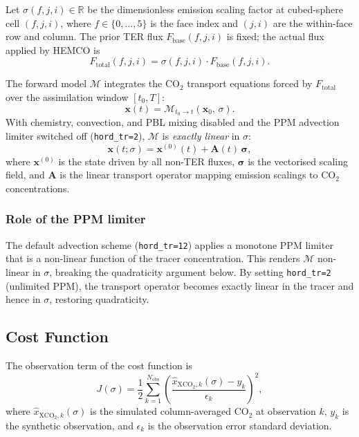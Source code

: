 \documentclass[12pt]{article}
\begin{document}
Let $\sigma(f,j,i) \in \mathbb{R}$ be the dimensionless emission scaling
factor at cubed-sphere cell $(f,j,i)$, where $f\in\{0,\ldots,5\}$ is the face
index and $(j,i)$ are the within-face row and column.  The prior TER flux
$F_{\mathrm{base}}(f,j,i)$ is fixed; the actual flux applied by HEMCO is
\begin{equation}
  F_{\mathrm{total}}(f,j,i) = \sigma(f,j,i)\cdot F_{\mathrm{base}}(f,j,i).
\end{equation}

The forward model $\mathcal{M}$ integrates the CO$_2$ transport equations
forced by $F_{\mathrm{total}}$ over the assimilation window
$[t_0, T]$:
\begin{equation}
  \mathbf{x}(t) = \mathcal{M}_{t_0 \to t}(\mathbf{x}_0,\,\sigma).
\end{equation}
With chemistry, convection, and PBL mixing disabled and the PPM advection
limiter switched off (\texttt{hord\_tr=2}), $\mathcal{M}$ is \emph{exactly
linear} in $\sigma$:
\begin{equation}
  \mathbf{x}(t;\sigma) = \mathbf{x}^{(0)}(t) + \mathbf{A}(t)\,\bm{\sigma},
  \label{eq:linearity}
\end{equation}
where $\mathbf{x}^{(0)}$ is the state driven by all non-TER fluxes,
$\bm{\sigma}$ is the vectorised scaling field, and $\mathbf{A}$ is the linear
transport operator mapping emission scalings to CO$_2$ concentrations.

\subsubsection*{Role of the PPM limiter}

The default advection scheme (\texttt{hord\_tr=12}) applies a monotone PPM
limiter that is a non-linear function of the tracer concentration.  This
renders $\mathcal{M}$ non-linear in $\sigma$, breaking the quadraticity
argument below.  By setting \texttt{hord\_tr=2} (unlimited PPM), the transport
operator becomes exactly linear in the tracer and hence in $\sigma$, restoring
quadraticity.

\subsection{Cost Function}

The observation term of the cost function is
\begin{equation}
  J(\sigma) = \frac{1}{2} \sum_{k=1}^{N_{\mathrm{obs}}}
  \left(\frac{\hat{x}_{\mathrm{XCO}_2,k}(\sigma) - y_k}{\epsilon_k}
  \right)^2,
  \label{eq:J}
\end{equation}
where $\hat{x}_{\mathrm{XCO}_2,k}(\sigma)$ is the simulated column-averaged
CO$_2$ at observation $k$, $y_k$ is the synthetic observation, and $\epsilon_k$
is the observation error standard deviation.
\end{document}
